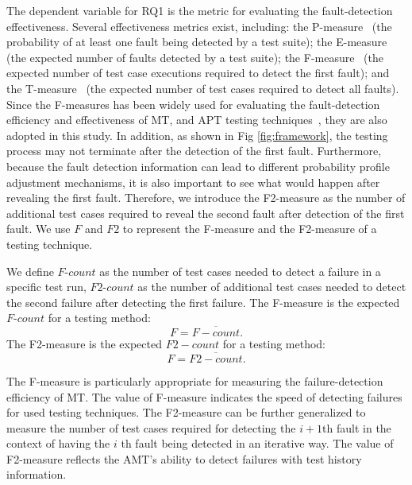 \documentclass[10pt,journal,compsoc]{IEEEtran}
\begin{document}
The dependent variable for RQ1 is the metric for evaluating the fault-detection effectiveness.
Several effectiveness metrics exist, including:
the P-measure~\cite{duran1984evaluation} (the probability of at least one fault being detected by a test suite);
the E-measure~\cite{chen1997optimal} (the expected number of faults detected by a test suite);
the F-measure~\cite{sun2018adaptive} (the expected number of test case executions required to detect the first fault); and
the T-measure~\cite{zhang2014history} (the expected number of test cases required to detect all faults).
Since the F-measures has been widely used for evaluating the fault-detection efficiency and effectiveness of MT, and APT testing techniques~\cite{sun2018adaptive, barus2016cost, barus2016impact}, they are also adopted in this study. In addition, as shown in Fig \ref{fig:framework}, the testing process may not terminate after the detection of the first fault. Furthermore, because the fault detection information can lead to different probability profile adjustment mechanisms, it is also important to see what would happen after revealing the first fault. Therefore, we introduce the F2-measure \cite{sun2018adaptive, sun2019dynamic} as the number of additional test cases required to reveal the second fault after detection of the first fault. We use $F$ and $F2$ to represent the F-measure and the F2-measure of a testing technique.

We define $F$-$count$ as the number of test cases needed to detect a failure in a specific test run, $F2$-$count$ as the number of additional test cases needed to detect the second failure after detecting the first failure.
The F-measure is the expected $F$-$count$ for a testing method:
\begin{equation}
  \label{eq:fmeasure}
  F = \overline{F-count}.
\end{equation}
The F2-measure is the expected $F2-count$ for a testing method:
\begin{equation}
  \label{eq:fmeasure}
  F = \overline{F2-count}.
\end{equation}

The F-measure is particularly appropriate for measuring the failure-detection efficiency of MT. The value of F-measure indicates the speed of detecting failures for used testing techniques. The F2-measure can be further generalized to measure the number of test cases required for detecting the $i+1$th fault in the context of having the $i$ th fault being detected in an iterative way. The value of F2-measure reflects the AMT's ability to detect failures with test history information.
\end{document}

